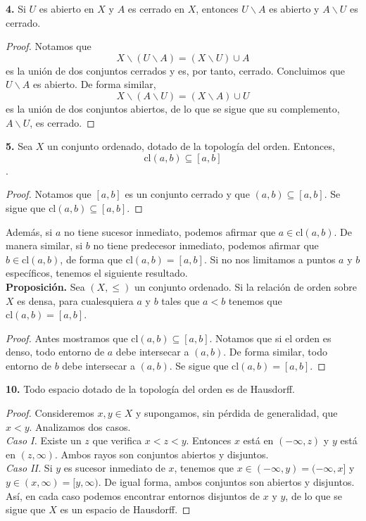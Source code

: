 \documentclass{article}
\begin{document}
\begin{mybox}
\textbf{4. } 	Si $U$ es abierto en $X$ y $A$ es cerrado en $X$, entonces $U \backslash A$ es abierto y $A \backslash U$ es cerrado.
\end{mybox}
\begin{proof}
	Notamos que 
	$$ X \backslash ( U \backslash  A) = (X \backslash U) \cup A $$
	es la unión de dos conjuntos cerrados y es, por tanto, cerrado. Concluimos que $U\backslash A$ es abierto.  De forma similar,
	$$X \backslash ( A \backslash  U) = (X \backslash A) \cup U $$
	es la unión de dos conjuntos abiertos, de lo que se sigue que su complemento, $A \backslash U$, es cerrado. 
\end{proof}	

\begin{mybox}
	\textbf{5. } Sea $X$ un conjunto ordenado, dotado de la topología del orden. Entonces, 
	$$ \text{cl}(a, b) \subseteq [a, b ] $$. 
\end{mybox}	
\begin{proof}
	Notamos que $[a, b]$ es un conjunto cerrado y que $(a, b) \subseteq [a, b]$. Se sigue que $\text{cl}(a, b) \subseteq [a, b]$.
\end{proof}

Además, si $a$ no tiene sucesor inmediato, podemos afirmar que $a \in \text{cl}(a, b)$. De manera similar, si $b$ no tiene predecesor inmediato, podemos afirmar que $b \in \text{cl}(a, b)$, de forma que $\text{cl}(a, b) = [a, b]$. Si no nos limitamos a puntos $a$ y $b$ específicos, tenemos el siguiente resultado. \\

\textbf{Proposición. } Sea $(X, \leq )$ un conjunto ordenado. Si la relación de orden sobre $X$ es densa, para cualesquiera $a$ y $b$ tales que $a < b$ tenemos que $\text{cl}(a, b) = [a, b]$.
\begin{proof}
	Antes mostramos que $\text{cl}(a, b) \subseteq [a, b]$. Notamos que si el orden es denso, todo entorno de $a$ debe intersecar a $(a, b)$. De forma similar, todo entorno de $b$ debe intersecar a $(a, b)$. Se sigue que $\text{cl}(a, b) = [a, b]$.
\end{proof}

\begin{mybox}
	\textbf{10. } Todo espacio dotado de la topología del orden es de Hausdorff. 
\end{mybox}	
\begin{proof}
	Consideremos $x, y \in X$ y supongamos, sin pérdida de generalidad, que $x < y$. Analizamos dos casos. \\
	\textit{Caso I. } Existe un $z$ que verifica $x < z < y$. Entonces $x$ está en $(- \infty, z)$ y $y$ está en  $(z, \infty)$. Ambos rayos son conjuntos abiertos y disjuntos. \\
	\textit{Caso II. } Si $y$ es sucesor inmediato de $x$, tenemos que $x \in ( - \infty, y) = (- \infty,x]$ y $y \in (x, \infty) = [y, \infty)$. De igual forma, ambos conjuntos son abiertos y disjuntos. \\
	Así, en cada caso podemos encontrar entornos disjuntos de $x$ y $y$, de lo que se sigue que $X$ es un espacio de Hausdorff. 
\end{proof}
\end{document}
